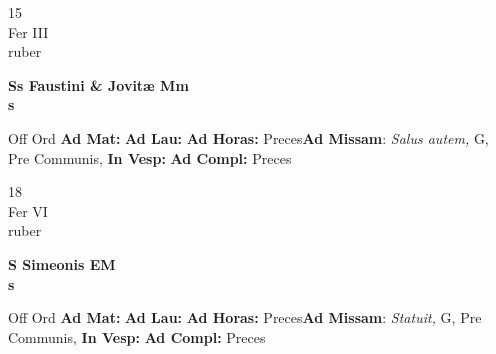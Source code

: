 \documentclass[10pt, openany]{book}
\begin{document}
        \begin{center}
            \begin{minipage}{3.5in}
                \vspace{2em}
                \begin{minipage}{0.5in}
                    {\Huge 15} \\
                    {\normalsize Fer III} \\
                    {\normalsize ruber}
                \end{minipage}
                \begin{minipage}{3.0in}
                    \textbf{ \large Ss Faustini \& Jovitæ Mm \\
                    \textnormal{\normalsize s}} \\ 
                \end{minipage}
                \begin{justify}Off Ord
                    \textbf{Ad Mat: }
                    \textbf{Ad Lau: }
                    \textbf{Ad Horas: }Preces\textbf{Ad Missam}: \textit{Salus autem,} G, Pre Communis,  
                    \textbf{In Vesp: }
                    \textbf{Ad Compl: }Preces
                \end{justify}
            \end{minipage}
        \end{center}
    
        \begin{center}
            \begin{minipage}{3.5in}
                \vspace{2em}
                \begin{minipage}{0.5in}
                    {\Huge 18} \\
                    {\normalsize Fer VI} \\
                    {\normalsize ruber}
                \end{minipage}
                \begin{minipage}{3.0in}
                    \textbf{ \large S Simeonis EM \\
                    \textnormal{\normalsize s}} \\ 
                \end{minipage}
                \begin{justify}Off Ord
                    \textbf{Ad Mat: }
                    \textbf{Ad Lau: }
                    \textbf{Ad Horas: }Preces\textbf{Ad Missam}: \textit{Statuit,} G, Pre Communis,  
                    \textbf{In Vesp: }
                    \textbf{Ad Compl: }Preces
                \end{justify}
            \end{minipage}
        \end{center}
    
\end{document}
